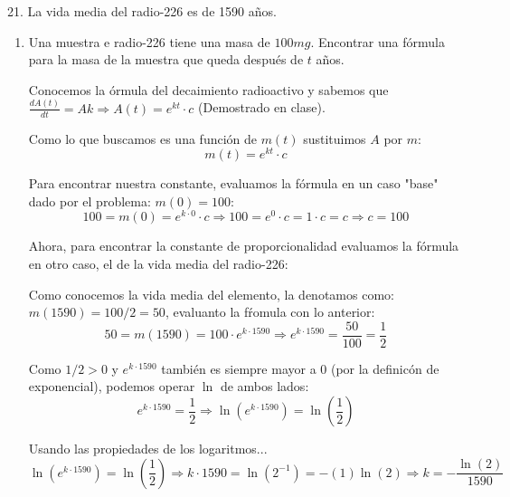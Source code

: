 \documentclass[12pt]{article}
\begin{document}
21. La vida media del radio-226 es de 1590 años.

\begin{enumerate}[\hspace{9px} a)]
    \item Una muestra e radio-226 tiene una masa de $100mg$. Encontrar una fórmula para la masa de la muestra que queda después de $t$ años.\medskip
    
        Conocemos la \'ormula del decaimiento radioactivo y sabemos que \(\displaystyle\frac{dA(t)}{dt}=Ak \Longrightarrow A(t) = e^{kt}\cdot c\) (Demostrado en clase).\medskip

        Como lo que buscamos es una funci\'on de $m(t)$ sustituimos $A$ por $m$:
        \[m(t)=e^{kt}\cdot c\]

        Para encontrar nuestra constante, evaluamos la f\'ormula en un caso "base" dado por el problema: \(m(0)=100\):
        \[100=m(0)=e^{k\cdot0}\cdot c \Longrightarrow 100=e^0\cdot c=1\cdot c=c \Longrightarrow c=100\]

        Ahora, para encontrar la constante de proporcionalidad evaluamos la f\'ormula en otro caso, el de la vida media del radio-226: 
        
        Como conocemos la vida media del elemento, la denotamos como: \(m(1590)=100/2=50\), evaluanto la f\'romula con lo anterior:
        \begin{equation*}
            50=m(1590)=100\cdot e^{k\cdot1590} \Longrightarrow e^{k\cdot1590}=\frac{50}{100}=\frac{1}{2}
        \end{equation*}

        Como \(1/2>0\) y \(e^{k\cdot1590}\) tambi\'en es siempre mayor a 0 (por la definic\'on de exponencial), podemos operar $\ln$ de ambos lados:
        \begin{equation*}
            e^{k\cdot1590}=\frac{1}{2} \Longrightarrow \ln\left(e^{k\cdot1590}\right)=\ln\left(\frac{1}{2}\right)
        \end{equation*}

        Usando las propiedades de los logaritmos...
        \begin{equation*}
            \ln\left(e^{k\cdot1590}\right)=\ln\left(\frac{1}{2}\right) \Longrightarrow k\cdot1590 = \ln(2^{-1}) = -(1)\ln(2) \Longrightarrow k = -\frac{\ln(2)}{1590}
        \end{equation*}


\end{enumerate}
\end{document}
